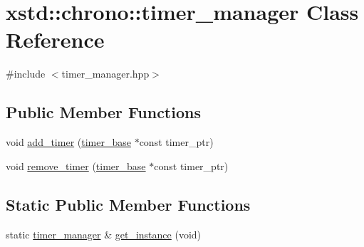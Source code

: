 \hypertarget{classxstd_1_1chrono_1_1timer__manager}{\section{xstd\-:\-:chrono\-:\-:timer\-\_\-manager Class Reference}
\label{classxstd_1_1chrono_1_1timer__manager}
}


{\ttfamily \#include $<$timer\-\_\-manager.\-hpp$>$}

\subsection*{Public Member Functions}
\begin{DoxyCompactItemize}
\item 
void \hyperlink{classxstd_1_1chrono_1_1timer__manager_ae97c0dba8154bace5af93caae4948c8c}{add\-\_\-timer} (\hyperlink{classxstd_1_1chrono_1_1timer__base}{timer\-\_\-base} $\ast$const timer\-\_\-ptr)
\item 
void \hyperlink{classxstd_1_1chrono_1_1timer__manager_af368bd572a757f8f78e39e4572114a84}{remove\-\_\-timer} (\hyperlink{classxstd_1_1chrono_1_1timer__base}{timer\-\_\-base} $\ast$const timer\-\_\-ptr)
\end{DoxyCompactItemize}
\subsection*{Static Public Member Functions}
\begin{DoxyCompactItemize}
\item 
static \hyperlink{classxstd_1_1chrono_1_1timer__manager}{timer\-\_\-manager} \& \hyperlink{classxstd_1_1chrono_1_1timer__manager_a8894928f093db753153f2f87dfa511e0}{get\-\_\-instance} (void)
\end{DoxyCompactItemize}
